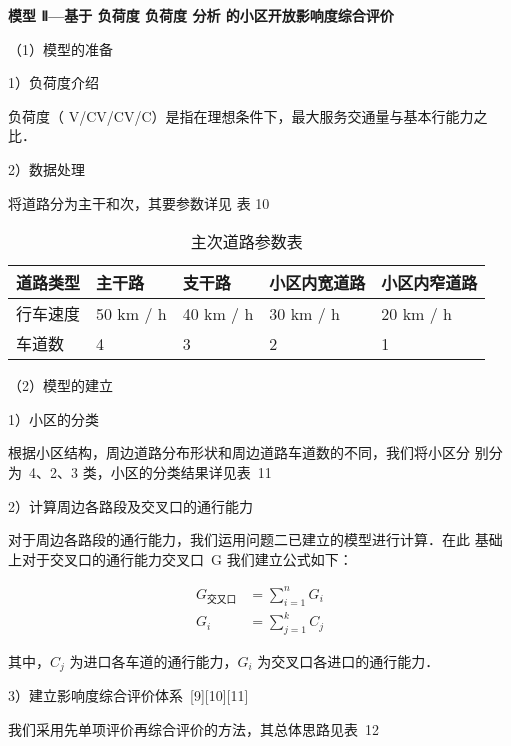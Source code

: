 \documentclass[12pt,a4paper]{nmmcm}
\begin{document}
\textbf{模型 Ⅱ—基于 负荷度 负荷度 分析 的小区开放影响度综合评价}

（1）模型的准备

1）负荷度介绍

负荷度（ V/CV/CV/C）是指在理想条件下，最大服务交通量与基本行能力之比．

2）数据处理

将道路分为主干和次，其要参数详见 表 10

\begin{table*}[h!]
  \centering
  \small
  \tabcolsep 2.5pt
  \caption{主次道路参数表}
  \begin{tabular*}{0.8\linewidth}{p{60pt}<{\centering}p{60pt}<{\centering}
    p{60pt}<{\centering}p{80pt}<{\centering}p{80pt}<{\centering}}
    \toprule
    道路类型  &  主干路  &  支干路  &  小区内宽道路  &  小区内窄道路  \\
    \midrule
    行车速度  & 50 km / h & 40 km / h & 30 km / h & 20 km / h \\
    车道数  & 4 & 3 & 2 & 1 \\
    \bottomrule
  \end{tabular*}
  \label{tab10}
\end{table*}

（2）模型的建立

1）小区的分类

根据小区结构，周边道路分布形状和周边道路车道数的不同，我们将小区分
别分为~4、2、3 类，小区的分类结果详见表~11


2）计算周边各路段及交叉口的通行能力


对于周边各路段的通行能力，我们运用问题二已建立的模型进行计算．在此
基础上对于交叉口的通行能力交叉口~G 我们建立公式如下：

\begin{align}
  G_{\text{交又口}} & =\sum_{i=1}^{n} G_{i} \\
  G_{i}          & =\sum_{j=1}^{k} C_{j}
\end{align}


其中，$C_{j}$ 为进口各车道的通行能力，$ G_{i}$ 为交叉口各进口的通行能力．


3）建立影响度综合评价体系~[9][10][11]

我们采用先单项评价再综合评价的方法，其总体思路见表~12
\end{document}
